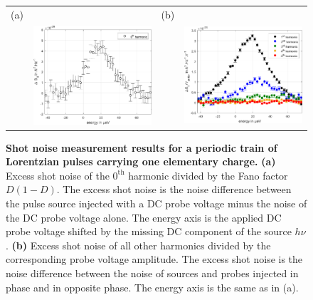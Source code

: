 \begin{figure}[hptb]
	\begin{center}
		\begin{tabular}{c c c c}
			(a) & & (b) &  \\ 
			
			& \includegraphics[width = 6cm]{./chap1/noise_spectro_leviton_1e_40ps} &
			& \includegraphics[width = 6cm]{./chap1/noise_tomo_leviton_1e_40ps}
		\end{tabular} 
	\end{center}
	\caption{\textbf{Shot noise measurement results for a periodic train of Lorentzian pulses carrying one elementary charge.} \textbf{(a)} Excess shot noise of the $0^{\mathrm{th}}$ harmonic divided by the Fano factor $D\left(1-D\right)$. The excess shot noise is the noise difference between the pulse source injected with a DC probe voltage minus the noise of the DC probe voltage alone. The energy axis is the applied DC probe voltage shifted by the missing DC component of the source $h\nu$.  \textbf{(b)} Excess shot noise of all other harmonics divided by the corresponding probe voltage amplitude. The excess shot noise is the noise difference between the noise of sources and probes injected in phase and in opposite phase. The energy axis is the same as in (a).}
	\label{fig: measured noise}
\end{figure}

